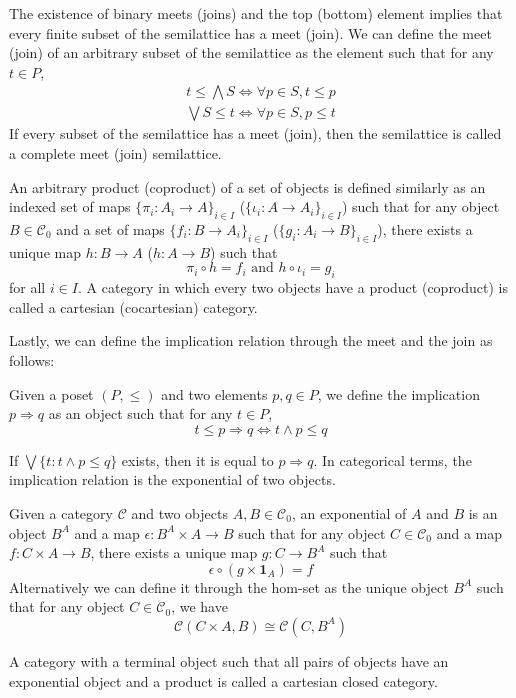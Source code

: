 The existence of binary meets (joins) and the top (bottom) element implies that every finite
subset of the semilattice has a meet (join).
We can define the meet (join) of an arbitrary subset of the semilattice
as the element such that for any $t\in P$,
\begin{gather*}
    t\leq \bigwedge S \iff \forall p\in S, t\leq p\\
    \bigvee S\leq t \iff \forall p\in S, p\leq t
\end{gather*}
If every subset of the semilattice has a meet (join), then the semilattice is called a complete meet (join) semilattice.

An arbitrary product (coproduct) of a set of objects is defined similarly as an indexed set of maps
$\{\pi_i:A_i\to A\}_{i\in I}$ ($\{\iota_i:A\to A_i\}_{i\in I}$) such that for any object $B\in\mathcal{C}_0$
and a set of maps $\{f_i:B\to A_i\}_{i\in I}$ ($\{g_i:A_i\to B\}_{i\in I}$), there exists a unique map $h:B\to A$ ($h:A\to B$) such that
\[
    \pi_i\circ h=f_i\text{ and }h\circ \iota_i=g_i
\]
for all $i\in I$.
A category in which every two objects have a product (coproduct) is called a cartesian (cocartesian) category.

Lastly, we can define the implication relation through the meet and the join as follows:
\begin{definition}[Implication]
    Given a poset $(P,\leq)$ and two elements $p,q\in P$, we define the implication $p\Rightarrow q$ as
    an object such that for any $t\in P$,
    \[
        t\leq p\Rightarrow q \iff t\wedge p\leq q
    \]
\end{definition}
If $\bigvee \{t:t\wedge p\leq q\}$ exists, then it is equal to $p\Rightarrow q$.
In categorical terms, the implication relation is the exponential of two objects.
\begin{definition}[Exponential]
    Given a category $\mathcal{C}$ and two objects $A,B\in\mathcal{C}_0$,
    an exponential of $A$ and $B$ is an object $B^A$ and a map $\epsilon:B^A\times A\to B$ such that for any object $C\in\mathcal{C}_0$
    and a map $f:C\times A\to B$, there exists a unique map $g:C\to B^A$ such that
    \[
        \epsilon\circ (g\times \mathbf{1}_A)=f
    \]
    Alternatively we can define it through the hom-set as the unique object $B^A$ such that
    for any object $C\in\mathcal{C}_0$, we have
    \[
        \mathcal{C}(C\times A,B)\cong \mathcal{C}(C,B^A)
    \]
\end{definition}
A category with a terminal object such that
all pairs of objects have an exponential object and a product is called a cartesian closed category.

